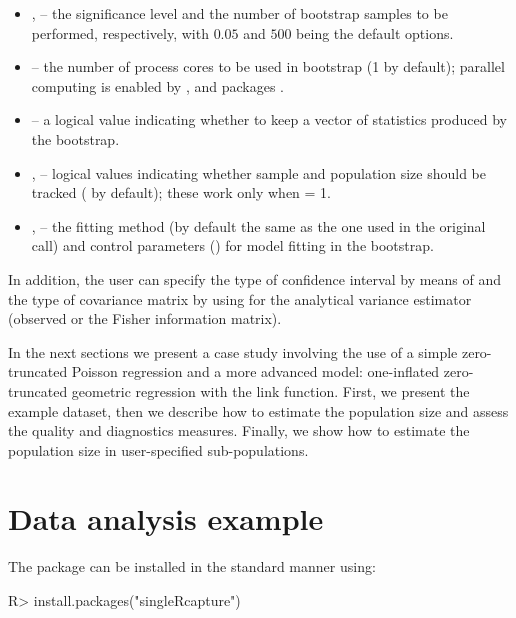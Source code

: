 \documentclass[nojss]{jss}
\newcommand{\1}{\mathcal{I}} \newcommand{\bZero}{\boldsymbol{0}}
\begin{document}
\begin{itemize}
  \item {},  -- the significance level and the number of bootstrap samples to be performed, respectively, with $0.05$ and $500$ being the default options.
  \item {} -- the number of process cores to be used in bootstrap (1 by default); parallel computing is enabled by  \citep{doParallel},  \citep{foreach} and  packages \citep{parallel}.
  \item {} -- a logical value indicating whether to keep a vector of statistics produced by the bootstrap.
  \item {},  --  logical values indicating whether sample and population size should be tracked ( by default); these work only when  = 1.
    \item {},  -- the fitting method (by default the same as the one used in the original call) and control parameters () for model fitting in the bootstrap.
\end{itemize}

In addition, the user can specify the type of confidence interval by
means of  and the type of covariance matrix by using
 for the analytical variance estimator (observed or the
Fisher information matrix).

In the next sections we present a case study involving the use of a
simple zero-truncated Poisson regression and a more advanced model:
one-inflated zero-truncated geometric regression with the 
link function. First, we present the example dataset, then we describe
how to estimate the population size and assess the quality and
diagnostics measures. Finally, we show how to estimate the population
size in user-specified sub-populations.

\section{Data analysis example}\label{sec-study}

The package can be installed in the standard manner using:

\begin{CodeChunk}
\begin{CodeInput}
R> install.packages("singleRcapture")
\end{CodeInput}
\end{CodeChunk}
\end{document}
